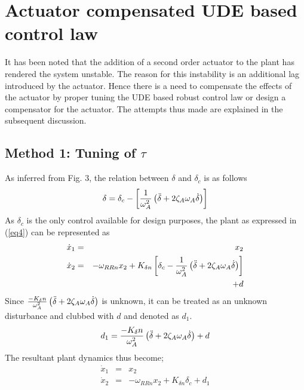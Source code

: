\documentclass[conference]{IEEEtran}
\begin{document}
\section{Actuator compensated UDE based control law}

It has been noted that the addition of a second order actuator to the plant has rendered the system unstable. The reason for this instability is an additional lag introduced by the actuator. Hence there is a need to compensate the effects of the actuator by proper tuning the UDE based robust control law or design a compensator for the actuator. The attempts thus made are explained in the subsequent discussion.

\subsection{Method 1: Tuning of $\tau$}
As inferred from Fig. 3, the relation between $\delta$ and $\delta_c$ is as follows
%
\begin{equation}
\delta = \delta_c - \left[{{1}\over{\omega^2_A}}\left( \ddot \delta + 2\zeta_A \omega_A \dot \delta\right)\right]
\label{eq12}
\end{equation}
%
As $\delta_c$ is the only control available for design purposes, the plant as expressed in (\ref{eq4}) can be represented as
%
\begin{eqnarray}
\dot{x}_1 &=& x_2 \nonumber \\
\dot{x}_2 &=& - \omega_{RRn}x_2 + K_{\delta n}\left[\delta_c - {{1}\over{\omega^2_A}}\left( \ddot \delta + 2\zeta_A \omega_A \dot \delta\right)\right] \nonumber \\
&& + d
\label{eq13}
\end{eqnarray}
Since ${{-K_\delta n}\over{\omega^2_A}}\left( \ddot \delta + 2\zeta_A \omega_A \dot \delta\right)$ is unknown, it can be treated as an unknown disturbance and clubbed with $d$ and denoted as $d_1$. 
\begin{equation}
d_1 = {{-K_\delta n}\over{\omega^2_A}}\left( \ddot \delta + 2\zeta_A \omega_A \dot \delta\right) + d
\label{eq14}
\end{equation}
The resultant plant dynamics thus become;
%
\begin{eqnarray}
\dot{x}_1 &=& x_2 \nonumber \\
\dot{x}_2 &=& - \omega_{RRn}x_2 + K_{\delta n}\delta_c + d_1
\label{eq15}
\end{eqnarray}
%
\end{document}
